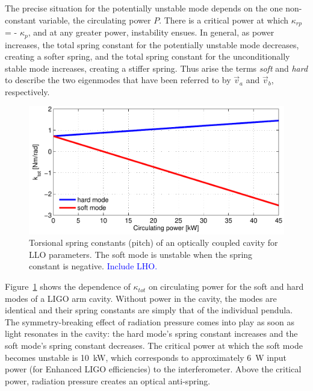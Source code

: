 The precise situation for the potentially unstable mode depends on the
one non-constant variable, the circulating power $P$. There is a
critical power at which $\kappa_{rp}$ = - $\kappa_p$, and at any
greater power, instability ensues. In general, as power increases, the
total spring constant for the potentially unstable mode decreases,
creating a softer spring, and the total spring constant for the
unconditionally stable mode increases, creating a stiffer spring. Thus
arise the terms \emph{soft} and \emph{hard} to describe the two
eigenmodes that have been referred to by $\vec{v}_a$ and $\vec{v}_b$,
respectively.

\begin{figure}
\begin{centering}
\includegraphics[width=1.0\textwidth]{figures/khardsoftLLO.pdf}
\caption[Torsional spring constants of an optically coupled
  cavity]{Torsional spring constants (pitch) of an optically coupled
  cavity for LLO parameters. The soft mode is unstable when the spring
  constant is negative. \textcolor{blue}{Include LHO.}}
\label{fig:k_hardsoft}
\end{centering}
\end{figure}

Figure~\ref{fig:k_hardsoft} shows the dependence of $\kappa_{tot}$ on
circulating power for the soft and hard modes of a LIGO arm
cavity. Without power in the cavity, the modes are identical and their
spring constants are simply that of the individual pendula. The
symmetry-breaking effect of radiation pressure comes into play as soon
as light resonates in the cavity: the hard mode's spring constant
increases and the soft mode's spring constant decreases. The critical
power at which the soft mode becomes unstable is 10~kW, which
corresponds to approximately 6~W input power (for Enhanced LIGO
efficiencies) to the interferometer. Above the critical power,
radiation pressure creates an optical anti-spring. 

